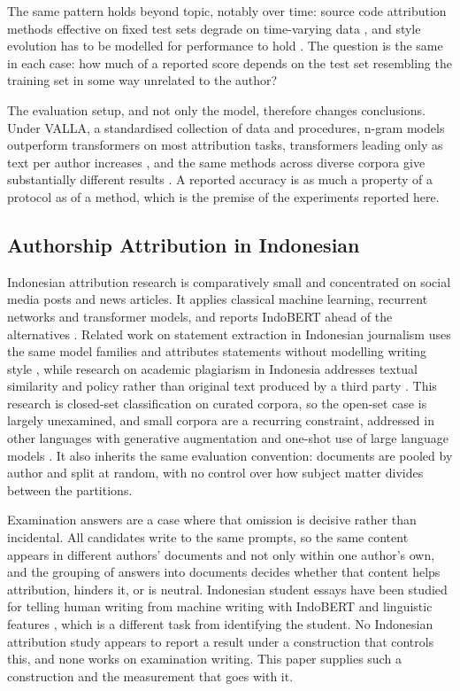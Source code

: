 \documentclass[conference]{IEEEtran}
\begin{document}
The same pattern holds beyond topic, notably over time: source code attribution methods effective on fixed test sets degrade on time-varying data \cite{Bogomolov2021}, and style evolution has to be modelled for performance to hold \cite{Li2024}. The question is the same in each case: how much of a reported score depends on the test set resembling the training set in some way unrelated to the author?

The evaluation setup, and not only the model, therefore changes conclusions. Under VALLA, a standardised collection of data and procedures, n-gram models outperform transformers on most attribution tasks, transformers leading only as text per author increases \cite{Tyo2022}, and the same methods across diverse corpora give substantially different results \cite{Murauer2021}. A reported accuracy is as much a property of a protocol as of a method, which is the premise of the experiments reported here.

\subsection{Authorship Attribution in Indonesian}

Indonesian attribution research is comparatively small and concentrated on social media posts and news articles. It applies classical machine learning, recurrent networks and transformer models, and reports IndoBERT ahead of the alternatives \cite{Saputra2023,Saputra2024,Muliono2023,Putra2022,Shaw2025}. Related work on statement extraction in Indonesian journalism uses the same model families and attributes statements without modelling writing style \cite{Yohanes2024}, while research on academic plagiarism in Indonesia addresses textual similarity and policy rather than original text produced by a third party \cite{Pratiwi2021}. This research is closed-set classification on curated corpora, so the open-set case is largely unexamined, and small corpora are a recurring constraint, addressed in other languages with generative augmentation \cite{Silva2023} and one-shot use of large language models \cite{Hu2024}. It also inherits the same evaluation convention: documents are pooled by author and split at random, with no control over how subject matter divides between the partitions.

Examination answers are a case where that omission is decisive rather than incidental. All candidates write to the same prompts, so the same content appears in different authors' documents and not only within one author's own, and the grouping of answers into documents decides whether that content helps attribution, hinders it, or is neutral. Indonesian student essays have been studied for telling human writing from machine writing with IndoBERT and linguistic features \cite{Adani2025}, which is a different task from identifying the student. No Indonesian attribution study appears to report a result under a construction that controls this, and none works on examination writing. This paper supplies such a construction and the measurement that goes with it.
\end{document}
